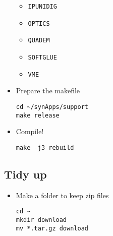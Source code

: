 \documentclass[11pt]{article}
\begin{document}
\begin{itemize}
\begin{itemize}
\item \verb~IPUNIDIG~
\item \verb~OPTICS~
\item \verb~QUADEM~
\item \verb~SOFTGLUE~
\item \verb~VME~
\end{itemize}
\item Prepare the makefile
\begin{verbatim}
cd ~/synApps/support
make release
\end{verbatim}
\item Compile!
\begin{verbatim}
make -j3 rebuild
\end{verbatim}
\end{itemize}
\subsection{Tidy up}
\label{sec-1-3}
\begin{itemize}
\item Make a folder to keep zip files
\begin{verbatim}
cd ~
mkdir download
mv *.tar.gz download
\end{verbatim}
\end{itemize}
\end{document}

